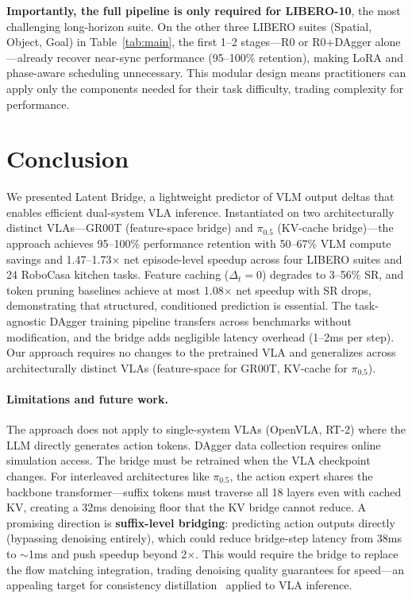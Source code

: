 \documentclass{article}
\begin{document}
\textbf{Importantly, the full pipeline is only required for LIBERO-10}, the most challenging long-horizon suite.
On the other three LIBERO suites (Spatial, Object, Goal) in Table~\ref{tab:main}, the first 1--2 stages---R0 or R0+DAgger alone---already recover near-sync performance (95--100\% retention), making LoRA and phase-aware scheduling unnecessary.
This modular design means practitioners can apply only the components needed for their task difficulty, trading complexity for performance.

\section{Conclusion}

We presented Latent Bridge, a lightweight predictor of VLM output deltas that enables efficient dual-system VLA inference.
Instantiated on two architecturally distinct VLAs---GR00T (feature-space bridge) and $\pi_{0.5}$ (KV-cache bridge)---the approach achieves 95--100\% performance retention with 50--67\% VLM compute savings and 1.47--1.73$\times$ net episode-level speedup across four LIBERO suites and 24 RoboCasa kitchen tasks.
Feature caching ($\Delta_t{=}0$) degrades to 3--56\% SR, and token pruning baselines achieve at most 1.08$\times$ net speedup with SR drops, demonstrating that structured, conditioned prediction is essential.
The task-agnostic DAgger training pipeline transfers across benchmarks without modification, and the bridge adds negligible latency overhead (1--2ms per step).
Our approach requires no changes to the pretrained VLA and generalizes across architecturally distinct VLAs (feature-space for GR00T, KV-cache for $\pi_{0.5}$).

\paragraph{Limitations and future work.}
The approach does not apply to single-system VLAs (OpenVLA, RT-2) where the LLM directly generates action tokens.
DAgger data collection requires online simulation access.
The bridge must be retrained when the VLA checkpoint changes.
For interleaved architectures like $\pi_{0.5}$, the action expert shares the backbone transformer---suffix tokens must traverse all 18 layers even with cached KV, creating a 32ms denoising floor that the KV bridge cannot reduce.
A promising direction is \textbf{suffix-level bridging}: predicting action outputs directly (bypassing denoising entirely), which could reduce bridge-step latency from 38ms to $\sim$1ms and push speedup beyond 2$\times$.
This would require the bridge to replace the flow matching integration, trading denoising quality guarantees for speed---an appealing target for consistency distillation~\cite{song2023consistency} applied to VLA inference.
\end{document}
